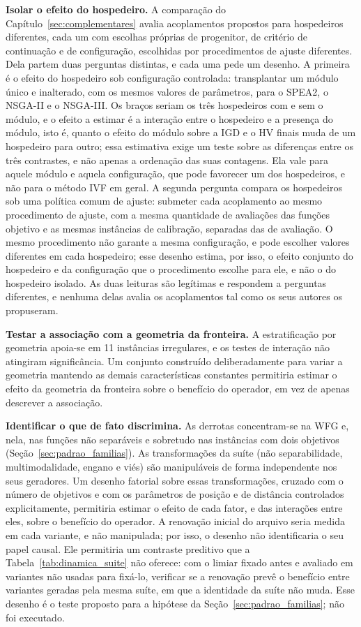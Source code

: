 \textbf{Isolar o efeito do hospedeiro.} A comparação do Capítulo~\ref{sec:complementares} avalia acoplamentos propostos para hospedeiros diferentes, cada um com escolhas próprias de progenitor, de critério de continuação e de configuração, escolhidas por procedimentos de ajuste diferentes. Dela partem duas perguntas distintas, e cada uma pede um desenho. A primeira é o efeito do hospedeiro sob configuração controlada: transplantar um módulo único e inalterado, com os mesmos valores de parâmetros, para o SPEA2, o NSGA-II e o NSGA-III. Os braços seriam os três hospedeiros com e sem o módulo, e o efeito a estimar é a interação entre o hospedeiro e a presença do módulo, isto é, quanto o efeito do módulo sobre a IGD e o HV finais muda de um hospedeiro para outro; essa estimativa exige um teste sobre as diferenças entre os três contrastes, e não apenas a ordenação das suas contagens. Ela vale para aquele módulo e aquela configuração, que pode favorecer um dos hospedeiros, e não para o método IVF em geral. A segunda pergunta compara os hospedeiros sob uma política comum de ajuste: submeter cada acoplamento ao mesmo procedimento de ajuste, com a mesma quantidade de avaliações das funções objetivo e as mesmas instâncias de calibração, separadas das de avaliação. O mesmo procedimento não garante a mesma configuração, e pode escolher valores diferentes em cada hospedeiro; esse desenho estima, por isso, o efeito conjunto do hospedeiro e da configuração que o procedimento escolhe para ele, e não o do hospedeiro isolado. As duas leituras são legítimas e respondem a perguntas diferentes, e nenhuma delas avalia os acoplamentos tal como os seus autores os propuseram.

\textbf{Testar a associação com a geometria da fronteira.} A estratificação por geometria apoia-se em 11 instâncias irregulares, e os testes de interação não atingiram significância. Um conjunto construído deliberadamente para variar a geometria mantendo as demais características constantes permitiria estimar o efeito da geometria da fronteira sobre o benefício do operador, em vez de apenas descrever a associação.

\textbf{Identificar o que de fato discrimina.} As derrotas concentram-se na WFG e, nela, nas funções não separáveis e sobretudo nas instâncias com dois objetivos (Seção~\ref{sec:padrao_familias}). As transformações da suíte (não separabilidade, multimodalidade, engano e viés) são manipuláveis de forma independente nos seus geradores. Um desenho fatorial sobre essas transformações, cruzado com o número de objetivos e com os parâmetros de posição e de distância controlados explicitamente, permitiria estimar o efeito de cada fator, e das interações entre eles, sobre o benefício do operador. A renovação inicial do arquivo seria medida em cada variante, e não manipulada; por isso, o desenho não identificaria o seu papel causal. Ele permitiria um contraste preditivo que a Tabela~\ref{tab:dinamica_suite} não oferece: com o limiar fixado antes e avaliado em variantes não usadas para fixá-lo, verificar se a renovação prevê o benefício entre variantes geradas pela mesma suíte, em que a identidade da suíte não muda. Esse desenho é o teste proposto para a hipótese da Seção~\ref{sec:padrao_familias}; não foi executado.

